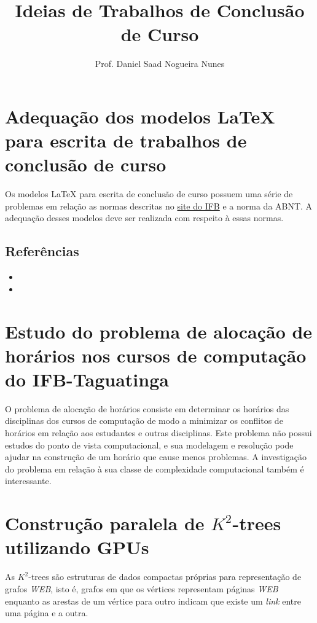 \documentclass{article}
\author{Prof. Daniel Saad Nogueira Nunes}
\title{Ideias de Trabalhos de Conclusão de Curso}
\date{}
\begin{document}
\maketitle



\section*{Adequação dos modelos \LaTeX{} para escrita de trabalhos de conclusão de curso}

Os modelos \LaTeX{} para escrita de conclusão de curso possuem uma série de problemas em relação as normas descritas no \href{https://normaliza.ifb.edu.br/doku.php}{site do IFB} e a norma da ABNT. A adequação desses modelos deve ser realizada com respeito à essas normas.




\subsection*{Referências}

\begin{itemize}
	\item {}
	\item {}
\end{itemize}

\section*{Estudo do problema de alocação de horários nos cursos de computação do IFB-Taguatinga}

O problema de alocação de horários consiste em determinar os horários das disciplinas dos cursos de computação de modo a minimizar os conflitos de horários em relação aos estudantes e outras disciplinas. Este problema não possui estudos do ponto de vista computacional, e sua modelagem e resolução pode ajudar na construção de um horário que cause menos problemas. A investigação do problema em relação à sua classe de complexidade computacional também é interessante. 


\section*{Construção paralela de $K^2$-trees utilizando GPUs}

As $K^2$-trees são estruturas de dados compactas próprias para representação de grafos \textit{WEB}, isto é, grafos em que os vértices representam páginas \textit{WEB} enquanto as arestas de um vértice para outro indicam que existe um \textit{link} entre uma página e a outra.
\end{document}
